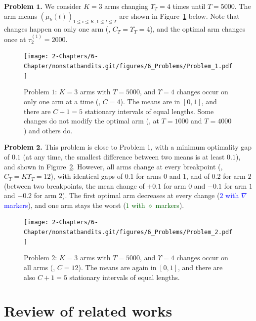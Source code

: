 \textbf{Problem $\bm 1$.}
We consider $K=3$ arms changing $\Upsilon_T=4$ times until $T=5000$.
The arm means $(\mu_k(t))_{1\leq i\leq K,1\leq t\leq T}$ are shown in Figure~\ref{fig:6:Problem_1} below.
Note that changes happen on only one arm (\ie, $C_T=\Upsilon_T=4$),
and the optimal arm changes once at $\tau_2^{(1)}=2000$.

\begin{figure}[h!]  %
    \centering
    \texttt{[image: 2-Chapters/6-Chapter/nonstatbandits.git/figures/6\_Problems/Problem\_1.pdf]}
    \caption{Problem $1$: $K=3$ arms with $T=5000$, and $\Upsilon=4$ changes occur on only one arm at a time (\ie, $C=4$).
        The means are in $[0,1]$, and there are $C+1=5$ stationary intervals of equal lengths.
        Some changes do not modify the optimal arm (\eg, at $T=1000$ and $T=4000$) and others do.
    }
    \label{fig:6:Problem_1}
\end{figure}


\textbf{Problem $\bm 2$.}
This problem is close to Problem 1, with a minimum optimality gap of $0.1$ (at any time, the smallest difference between two means is at least $0.1$),
and shown in Figure~\ref{fig:6:Problem_2}.
However, all arms change at every breakpoint (\ie, $C_T=K\Upsilon_T=12$), with identical gaps of $0.1$ for arms $0$ and $1$, and of $0.2$ for arm $2$ (between two breakpoints, the mean change of $+0.1$ for arm $0$ and $-0.1$ for arm $1$ and $-0.2$ for arm $2$).
The first optimal arm decreases at every change (\textcolor{blue}{$2$ with $\nabla$ markers}), and one arm stays the worst (\textcolor{darkgreen}{$1$ with $\diamond$ markers}).

\begin{figure}[h!]  %
    \centering
    \texttt{[image: 2-Chapters/6-Chapter/nonstatbandits.git/figures/6\_Problems/Problem\_2.pdf]}
    \caption{Problem $2$: $K=3$ arms with $T=5000$, and $\Upsilon=4$ changes occur on all arms (\ie, $C=12$).
        The means are again in $[0,1]$, and there are also $C+1=5$ stationary intervals of equal lengths.
    }
    \label{fig:6:Problem_2}
\end{figure}


\section{Review of related works}
\label{sec:6:relatedWork}

